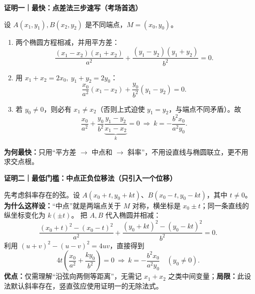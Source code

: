 \clearpage
\begin{proofbox}
\textbf{\textcolor{CProof}{证明一｜最快：点差法三步速写（考场首选）}}
\begin{center}\end{center}
设 $A(x_1,y_1),B(x_2,y_2)$ 是不同端点，$M=(x_0,y_0)$。
\begin{enumerate}[leftmargin=*,itemsep=0.25em]
\item 两个椭圆方程相减，并用平方差：
\[ \frac{(x_1-x_2)(x_1+x_2)}{a^2}+
      \frac{(y_1-y_2)(y_1+y_2)}{b^2}=0.\]
\item 用 $x_1+x_2=2x_0,\ y_1+y_2=2y_0$：
\[ \boxed{\frac{x_0}{a^2}(x_1-x_2)+\frac{y_0}{b^2}(y_1-y_2)=0.}\]
\item 若 $y_0\ne0$，则必有 $x_1\ne x_2$（否则上式迫使 $y_1=y_2$，与端点不同矛盾）。故
\[\frac{x_0}{a^2}+\frac{y_0}{b^2}\underbrace{\frac{y_1-y_2}{x_1-x_2}}_{k}=0
\ \Longrightarrow\ \boxed{k=-\frac{b^2x_0}{a^2y_0}}.\]
\end{enumerate}
\textbf{为何最快：}只用“平方差 $\to$ 中点和 $\to$ 斜率”，不用设直线与椭圆联立，更不用求交点根。
\end{proofbox}
\clearpage
\begin{proofbox}
\textbf{\textcolor{CProof}{证明二｜最低门槛：中点正负位移法（只引入一个位移）}}
\begin{center}\end{center}
先考虑斜率存在的弦。设 $A(x_0+t,y_0+kt)$、$B(x_0-t,y_0-kt)$，其中 $t\ne0$。\textbf{为什么这样设：}“中点”就是两端点关于 $M$ 对称，横坐标是 $x_0\pm t$；同一条直线的纵坐标变化为 $k(\pm t)$。
把 $A,B$ 代入椭圆并相减：
\[
\frac{(x_0+t)^2-(x_0-t)^2}{a^2}+
\frac{(y_0+kt)^2-(y_0-kt)^2}{b^2}=0.
\]
利用 $(u+v)^2-(u-v)^2=4uv$，直接得到
\[
4t\left(\frac{x_0}{a^2}+\frac{k y_0}{b^2}\right)=0
\ \Longrightarrow\ \boxed{k=-\frac{b^2x_0}{a^2y_0}}\quad(y_0\ne0).
\]
\textbf{优点：}仅需理解“沿弦向两侧等距离”，无需记 $x_1+x_2$ 之类中间变量；\textbf{局限：}此设法默认斜率存在，竖直弦应使用证明一的无除法式。
\end{proofbox}
\clearpage
